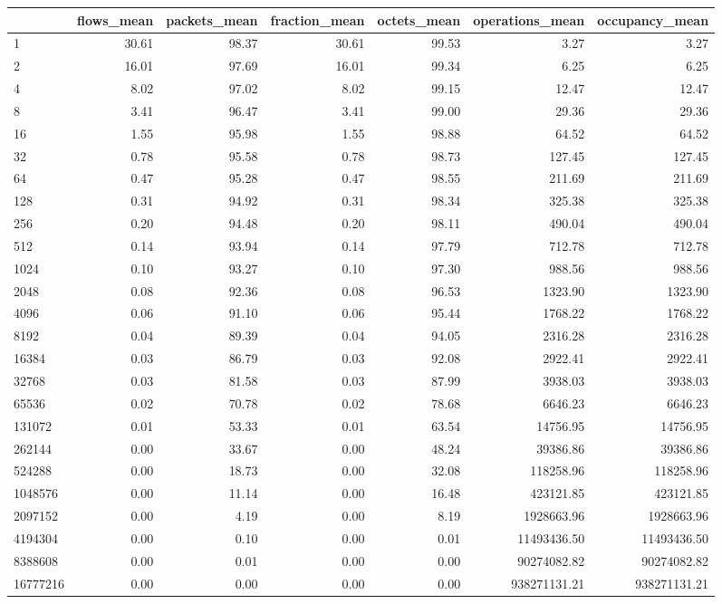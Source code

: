 \begin{tabular}{lrrrrrr}
\toprule
 & flows_mean & packets_mean & fraction_mean & octets_mean & operations_mean & occupancy_mean \\
\midrule
1 & 30.61 & 98.37 & 30.61 & 99.53 & 3.27 & 3.27 \\
2 & 16.01 & 97.69 & 16.01 & 99.34 & 6.25 & 6.25 \\
4 & 8.02 & 97.02 & 8.02 & 99.15 & 12.47 & 12.47 \\
8 & 3.41 & 96.47 & 3.41 & 99.00 & 29.36 & 29.36 \\
16 & 1.55 & 95.98 & 1.55 & 98.88 & 64.52 & 64.52 \\
32 & 0.78 & 95.58 & 0.78 & 98.73 & 127.45 & 127.45 \\
64 & 0.47 & 95.28 & 0.47 & 98.55 & 211.69 & 211.69 \\
128 & 0.31 & 94.92 & 0.31 & 98.34 & 325.38 & 325.38 \\
256 & 0.20 & 94.48 & 0.20 & 98.11 & 490.04 & 490.04 \\
512 & 0.14 & 93.94 & 0.14 & 97.79 & 712.78 & 712.78 \\
1024 & 0.10 & 93.27 & 0.10 & 97.30 & 988.56 & 988.56 \\
2048 & 0.08 & 92.36 & 0.08 & 96.53 & 1323.90 & 1323.90 \\
4096 & 0.06 & 91.10 & 0.06 & 95.44 & 1768.22 & 1768.22 \\
8192 & 0.04 & 89.39 & 0.04 & 94.05 & 2316.28 & 2316.28 \\
16384 & 0.03 & 86.79 & 0.03 & 92.08 & 2922.41 & 2922.41 \\
32768 & 0.03 & 81.58 & 0.03 & 87.99 & 3938.03 & 3938.03 \\
65536 & 0.02 & 70.78 & 0.02 & 78.68 & 6646.23 & 6646.23 \\
131072 & 0.01 & 53.33 & 0.01 & 63.54 & 14756.95 & 14756.95 \\
262144 & 0.00 & 33.67 & 0.00 & 48.24 & 39386.86 & 39386.86 \\
524288 & 0.00 & 18.73 & 0.00 & 32.08 & 118258.96 & 118258.96 \\
1048576 & 0.00 & 11.14 & 0.00 & 16.48 & 423121.85 & 423121.85 \\
2097152 & 0.00 & 4.19 & 0.00 & 8.19 & 1928663.96 & 1928663.96 \\
4194304 & 0.00 & 0.10 & 0.00 & 0.01 & 11493436.50 & 11493436.50 \\
8388608 & 0.00 & 0.01 & 0.00 & 0.00 & 90274082.82 & 90274082.82 \\
16777216 & 0.00 & 0.00 & 0.00 & 0.00 & 938271131.21 & 938271131.21 \\
\bottomrule
\end{tabular}
